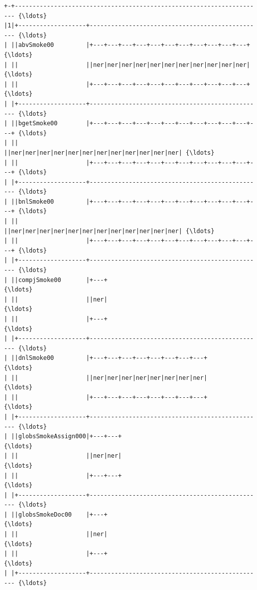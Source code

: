 \documentclass[11pt,letter,landscape]{article}
\begin{document}
    \begin{Verbatim}[commandchars=\\\{\}]
+-+---------------------------------------------------------------------- {\ldots}
|1|+-------------------+------------------------------------------------- {\ldots}
| ||abvSmoke00         |+---+---+---+---+---+---+---+---+---+---+---+     {\ldots}
| ||                   ||ner|ner|ner|ner|ner|ner|ner|ner|ner|ner|ner|     {\ldots}
| ||                   |+---+---+---+---+---+---+---+---+---+---+---+     {\ldots}
| |+-------------------+------------------------------------------------- {\ldots}
| ||bgetSmoke00        |+---+---+---+---+---+---+---+---+---+---+---+---+ {\ldots}
| ||                   ||ner|ner|ner|ner|ner|ner|ner|ner|ner|ner|ner|ner| {\ldots}
| ||                   |+---+---+---+---+---+---+---+---+---+---+---+---+ {\ldots}
| |+-------------------+------------------------------------------------- {\ldots}
| ||bnlSmoke00         |+---+---+---+---+---+---+---+---+---+---+---+---+ {\ldots}
| ||                   ||ner|ner|ner|ner|ner|ner|ner|ner|ner|ner|ner|ner| {\ldots}
| ||                   |+---+---+---+---+---+---+---+---+---+---+---+---+ {\ldots}
| |+-------------------+------------------------------------------------- {\ldots}
| ||compjSmoke00       |+---+                                             {\ldots}
| ||                   ||ner|                                             {\ldots}
| ||                   |+---+                                             {\ldots}
| |+-------------------+------------------------------------------------- {\ldots}
| ||dnlSmoke00         |+---+---+---+---+---+---+---+---+                 {\ldots}
| ||                   ||ner|ner|ner|ner|ner|ner|ner|ner|                 {\ldots}
| ||                   |+---+---+---+---+---+---+---+---+                 {\ldots}
| |+-------------------+------------------------------------------------- {\ldots}
| ||globsSmokeAssign000|+---+---+                                         {\ldots}
| ||                   ||ner|ner|                                         {\ldots}
| ||                   |+---+---+                                         {\ldots}
| |+-------------------+------------------------------------------------- {\ldots}
| ||globsSmokeDoc00    |+---+                                             {\ldots}
| ||                   ||ner|                                             {\ldots}
| ||                   |+---+                                             {\ldots}
| |+-------------------+------------------------------------------------- {\ldots}

\end{Verbatim}
\end{document}
